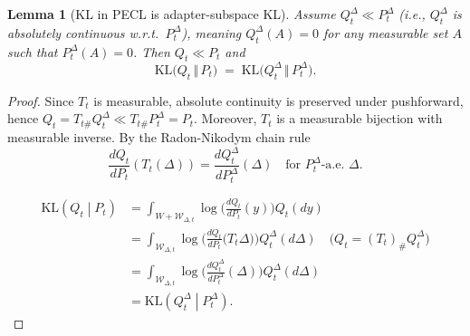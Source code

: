 \documentclass{article}
\theoremstyle{plain}
\newtheorem{lemma}[theorem]{Lemma}
\theoremstyle{definition}
\theoremstyle{remark}
\begin{document}

\begin{lemma}[KL in PECL is adapter-subspace KL]
Assume $Q_t^\Delta \ll P_t^\Delta$ (i.e., $Q_t^\Delta$ is absolutely continuous w.r.t.\ $P_t^\Delta$), meaning $Q_t^\Delta(A)=0$ for any measurable set $A$ such that $P_t^\Delta(A)=0$.
Then $Q_t \ll P_t$ and
$$
\mathrm{KL}\bigl(Q_t\,\Vert\, P_t\bigr)
\;=\;
\mathrm{KL}\bigl(Q_t^\Delta \,\Vert\, P_t^\Delta\bigr).
$$
\end{lemma}

\begin{proof}
  Since $T_t$ is measurable, absolute continuity is preserved under pushforward, hence
$Q_t=T_{t\#}Q_t^\Delta \ll T_{t\#}P_t^\Delta=P_t$.
Moreover, $T_t$ is a measurable bijection with measurable inverse. 
  By the Radon-Nikodym chain rule
 \[
 \frac{dQ_t}{dP_t}(T_t(\Delta))=\frac{dQ_t^{\Delta}}{dP_t^{\Delta}}(\Delta)\quad\text{for }P^{\Delta}_t\text{-a.e.\ }\Delta.
 \]

\begin{equation*}
     \begin{aligned}
 \mathrm{KL}\left(Q_t\middle|P_t\right)
 &= \int_{W+\mathcal W_{\Delta,t}}
 \log\Big(\frac{dQ_t}{dP_t}(y)\Big)
 Q_t(dy)\\
 &= \int_{\mathcal W_{\Delta,t}}
 \log\Big(\frac{dQ_t}{dP_t}\big(T_t\Delta\big)\Big)
 Q_t^{\Delta}(d\Delta) \quad \text{(} Q_t=(T_t)_{\text{\#}}Q_t^{\Delta}\text{)} 
 \\
 &= \int_{\mathcal W_{\Delta,t}}
 \log\Big(\frac{dQ_t^{\Delta}}{dP_t^{\Delta}}(\Delta)\Big)
 Q_t^{\Delta}(d\Delta) \\
 &= \mathrm{KL}\left(Q_t^{\Delta}\middle|P_t^{\Delta}\right).
 \end{aligned}
\end{equation*} 
\end{proof}
\end{document}

